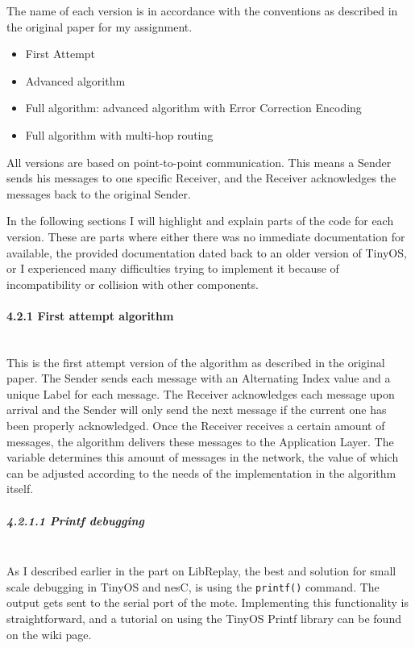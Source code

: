 The name of each version is in accordance with the conventions as
described in the original paper for my assignment\cite{dolev2012self}.

\begin{itemize}
\itemsep1pt\parskip0pt
\item
  First Attempt
\item
  Advanced algorithm
\item
  Full algorithm: advanced algorithm with Error Correction Encoding
\item
  Full algorithm with multi-hop routing
\end{itemize}

All versions are based on point-to-point communication. This means a
Sender sends his messages to one specific Receiver, and the Receiver
acknowledges the messages back to the original Sender.

In the following sections I will highlight and explain parts of the code
for each version. These are parts where either there was no immediate
documentation for available, the provided documentation dated back to an
older version of TinyOS, or I experienced many difficulties trying to
implement it because of incompatibility or collision with other
components.

\paragraph{4.2.1 First attempt
algorithm\\\\}\label{first-attempt-algorithm}

This is the first attempt version of the algorithm as described in the
original paper\cite{dolev2012self}. The Sender sends each message with
an Alternating Index value and a unique Label for each message. The
Receiver acknowledges each message upon arrival and the Sender will only
send the next message if the current one has been properly acknowledged.
Once the Receiver receives a certain amount of messages, the algorithm
delivers these messages to the Application Layer. The variable \emph{}
determines this amount of messages in the network, the value of which
can be adjusted according to the needs of the implementation in the
algorithm itself.

\subparagraph{4.2.1.1 Printf debugging\\\\}\label{printf-debugging}

As I described earlier in the part on LibReplay, the best and solution
for small scale debugging in TinyOS and nesC, is using the
\texttt{printf()} command. The output gets sent to the serial port of
the mote. Implementing this functionality is straightforward, and a
tutorial on using the TinyOS Printf library can be found on the wiki
page\cite{wiki2010tinyos}.

